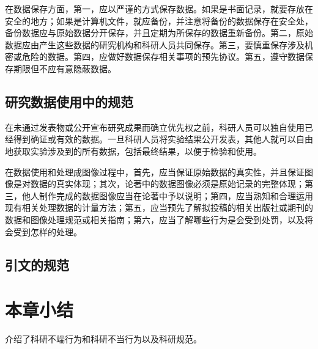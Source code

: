 在数据保存方面，第一，应以严谨的方式保存数据。如果是书面记录，就要存放在安全的地方；如果是计算机文件，就应备份，并注意将备份的数据保存在安全处，备份数据应与原始数据分开保存，并且定期为所保存的数据重新备份。第二，原始数据应由产生这些数据的研究机构和科研人员共同保存。第三，要慎重保存涉及机密或危险的数据。第四，应做好数据保存相关事项的预先协议。第五，遵守数据保存期限但不应有意隐蔽数据。

\subsection{研究数据使用中的规范}
在未通过发表物或公开宣布研究成果而确立优先权之前，科研人员可以独自使用已经得到确证或有效的数据。一旦科研人员将实验结果公开发表，其他人就可以自由地获取实验涉及到的所有数据，包括最终结果，以便于检验和使用。

在数据使用和处理成图像过程中，首先，应当保证原始数据的真实性，并且保证图像是对数据的真实体现；其次，论著中的数据图像必须是原始记录的完整体现；第三，他人制作完成的数据图像应当在论著中予以说明；第四，应当熟知和合理运用现有相关处理数据的计量方法；第五，应当预先了解拟投稿的相关出版社或期刊的数据和图像处理规范或相关指南；第六，应当了解哪些行为是会受到处罚，以及将会受到怎样的处理。


\subsection{引文的规范}

\section{本章小结}
介绍了科研不端行为和科研不当行为以及科研规范。











